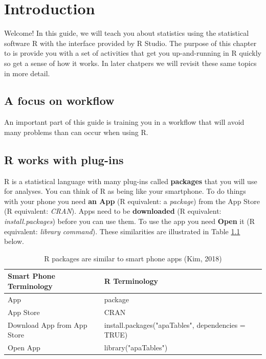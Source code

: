 \documentclass[
]{krantz}
\begin{document}
\mainmatter

\hypertarget{introduction}{%
\chapter{Introduction}\label{introduction}}

Welcome! In this guide, we will teach you about statistics using the statistical software R with the interface provided by R Studio. The purpose of this chapter to is provide you with a set of activities that get you up-and-running in R quickly so get a sense of how it works. In later chatpers we will revisit these same topics in more detail.

\hypertarget{a-focus-on-workflow}{%
\section{A focus on workflow}\label{a-focus-on-workflow}}

An important part of this guide is training you in a workflow that will avoid many problems than can occur when using R.

\hypertarget{r-works-with-plug-ins}{%
\section{R works with plug-ins}\label{r-works-with-plug-ins}}

R is a statistical language with many plug-ins called \textbf{packages} that you will use for analyses. You can think of R as being like your smartphone. To do things with your phone you need \textbf{an App} (R equivalent: a \emph{package}) from the App Store (R equivalent: \emph{CRAN}). Apps need to be \textbf{downloaded} (R equivalent: \emph{install.packages}) before you can use them. To use the app you need \textbf{Open} it (R equivalent: \emph{library command}). These similarities are illustrated in Table \ref{tab:appstore} below.

\begin{table}

\caption{\label{tab:appstore}R packages are similar to smart phone apps (Kim, 2018)}
\centering
\begin{tabular}[t]{ll}
\toprule
Smart Phone Terminology & R Terminology\\
\midrule
App & package\\
App Store & CRAN\\
Download App from App Store & install.packages("apaTables", dependencies = TRUE)\\
Open App & library("apaTables")\\
\bottomrule
\end{tabular}
\end{table}
\end{document}
